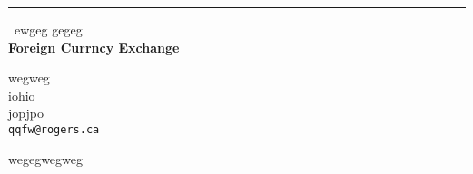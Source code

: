\documentclass{report}
\begin{document}
\begin{center}
\rule{6in}{1pt} \
{\large ewgeg gegeg \\
{\bf Foreign Currncy Exchange}}

wegweg \\ iohio \\ jopjpo
\\
{\tt qqfw@rogers.ca}\end{center}

wegegwegweg
\end{document}
